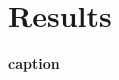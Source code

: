 \documentclass[11pt, oneside]{article}
\begin{document}

\section*{Results}

\begin{table*}[htbp]
\fontsize{10}{12}
\selectfont
\textbf{caption} \\ \\
\begin{center}
\begin{tabular}{lccccc}
\toprule



\bottomrule
\end{tabular}
\end{center}
\end{table*}
\end{document}
